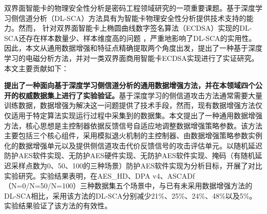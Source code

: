 %

双界面智能卡的物理安全性分析是密码工程领域研究的一项重要课题。基于深度学习侧信道分析（DL-SCA）方法具有为智能卡物理安全性分析提供技术支持的能力。然而，%
针对双界面智能卡上椭圆曲线数字签名算法（ECDSA）实现的DL-SCA还存在样本数量少、样本维度高的问题
，严重地影响了DL-SCA的实用性。因此，本文从通用数据增强和特征点精确提取两个角度出发，提出了一种基于深度学习的电磁分析方法，并对一类双界面商用智能卡ECDSA实现进行了实证研究。本文主要贡献如下：

\textbf{提出了一种面向基于深度学习侧信道分析的通用数据增强方法，并在本领域四个公开的权威数据集上进行了实验验证。}基于深度学习的侧信道攻击方法通常需要大量训练数据，数据增强为解决这一问题提供了技术手段，然而，现有数据增强方法仅仅适用于特定算法实现运行过程中采集到的数据集。本文提出了一种通用数据增强方法，核心思想是主控制器依据反馈信号自适应地调整数据增强策略参数。该方法主要包括三个核心组件，采用模拟退火机制的主控制器、由数据增强策略参数实例化的数据增强单元以及提供侧信道攻击代价反馈信号的攻击评估单元。以随机延迟防护AES软件实现、无防护AES硬件实现、无防护AES软件实现、掩码（有随机延迟采样点数为0、50、100的三种场景）防护AES软件实现为分析目标，开展了对比实验研究。实验结果表明，在AES\_HD、DPA v4、ASCADf（N=0/N=50/N=100）三种数据集五个场景中，与已有未采用数据增强方法的DL-SCA相比，采用该方法的DL-SCA\chenggongtiaoshu 分别减少21\%、25\%、24\%、48\%以及5\%。实验结果验证了该方法的有效性。

